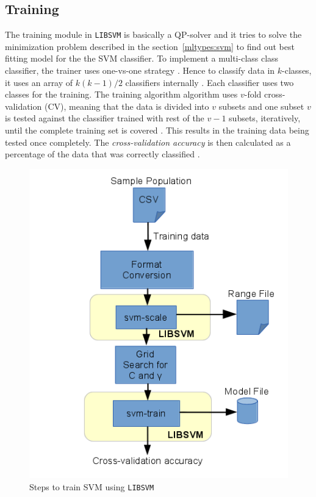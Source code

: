 \subsection{Training}

The training module in \texttt{LIBSVM} is basically a QP-solver and it tries to solve the minimization problem described in the section~\ref{mltypes:svm} to find out best fitting model for the  the SVM classifier. To implement a multi-class class classifier, the trainer uses one-vs-one strategy \cite{Knerr1990}. Hence to classify data in $k$-classes, it uses an array of $k(k-1)/2$ classifiers internally \cite{Chang2011}. Each classifier uses two classes for the training. The training algorithm algorithm uses $v$-fold cross-validation (CV), meaning that the data is divided into $v$ subsets and one subset $v$ is tested against the classifier trained with rest of the $v-1$ subsets, iteratively, until the complete training set is covered \cite{Hsu2003}. This results in the training data being tested once completely. The \emph{cross-validation accuracy} is then calculated as a percentage of the data that was correctly classified \cite{Hsu2003}.

\label{sec:impl:tr}
\begin{figure}[h]
  \begin{center}
    \captionsetup{justification=centering}
    \includegraphics[scale=0.75]{figures/libsvmtrain.png}
    \caption{Steps to train SVM using \texttt{LIBSVM}}
    \label{fig:libsvmtrain}
  \end{center}
\end{figure}

